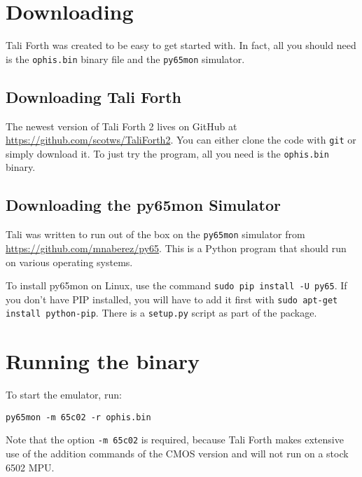 \section{Downloading}

Tali Forth was created to be easy to get started with. In fact, all you should
need is the \texttt{ophis.bin} binary file and the
\texttt{py65mon} simulator.

\subsection{Downloading Tali Forth}

The newest version of Tali Forth 2 lives on GitHub at
\href{https://github.com/scotws/TaliForth2}{https://github.com/scotws/TaliForth2}.
You can either clone the code with \texttt{git} or
simply download it. To just try the program, all you need is the
\texttt{ophis.bin} binary. 

\subsection{Downloading the py65mon Simulator}

Tali was written to run out of the box on the 
\texttt{py65mon} simulator from
\href{https://github.com/mnaberez/py65}{https://github.com/mnaberez/py65}. This
is a Python program that should run on various operating systems. 

To install py65mon on Linux, use the command \texttt{sudo pip
install -U py65}. If you don't have PIP installed, you will have to
add it first with \texttt{sudo apt-get install python-pip}.  There is a
\texttt{setup.py} script as part of the package.

\section{Running the binary}

To start the emulator, run:
\begin{lstlisting}[frame=single]
        py65mon -m 65c02 -r ophis.bin
\end{lstlisting}

\noindent Note that the option \texttt{-m 65c02} is required, because Tali Forth
makes extensive use of the addition commands of the CMOS version and will not
run on a stock 6502 MPU.

